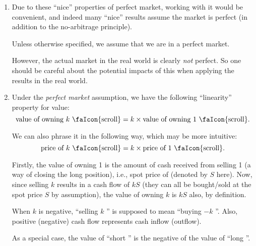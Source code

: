 \begin{enumerate}
\item Due to these ``nice'' properties of perfect market, working with it would
be convenient, and indeed many ``nice'' results assume the market is perfect
(in addition to the no-arbitrage principle).

Unless otherwise specified, we assume that we are in a perfect market.

\begin{warning}
However, the actual market in the real world is clearly \emph{not} perfect. So
one should be careful about the potential impacts of this when applying the
results in the real world.
\end{warning}

\item \label{it:value-linear}
Under the \emph{perfect market} assumption, we have the following ``linearity''
property for value:
\[
\text{value of owning \(k\) \faIcon{scroll}} = k\times\text{value of owning 1 \faIcon{scroll}}.
\]
\begin{note}
We can also phrase it in the following way, which may be more intuitive:
\[
\text{price of \(k\) \faIcon{scroll}} = k\times\text{price of 1 \faIcon{scroll}}.
\]
\end{note}

\begin{pf}
Firstly, the value of owning 1  is the amount of cash
 received from selling 1  (a way of closing
the long position), i.e., spot price of  (denoted by \(S\)
here). Now, since selling \(k\)  results in a cash flow of
\(kS\) (they can all be bought/sold at the spot price \(S\) by assumption), the
value of owning \(k\)  is \(kS\) also, by definition.

\begin{note}
When \(k\) is negative, ``selling \(k\) '' is supposed to
mean ``buying \(-k\) ''. Also, positive (negative) cash flow
represents cash inflow (outflow).
\end{note}
\end{pf}

As a special case, the value of ``short '' is the negative of
the value of ``long ''.
\end{enumerate}
